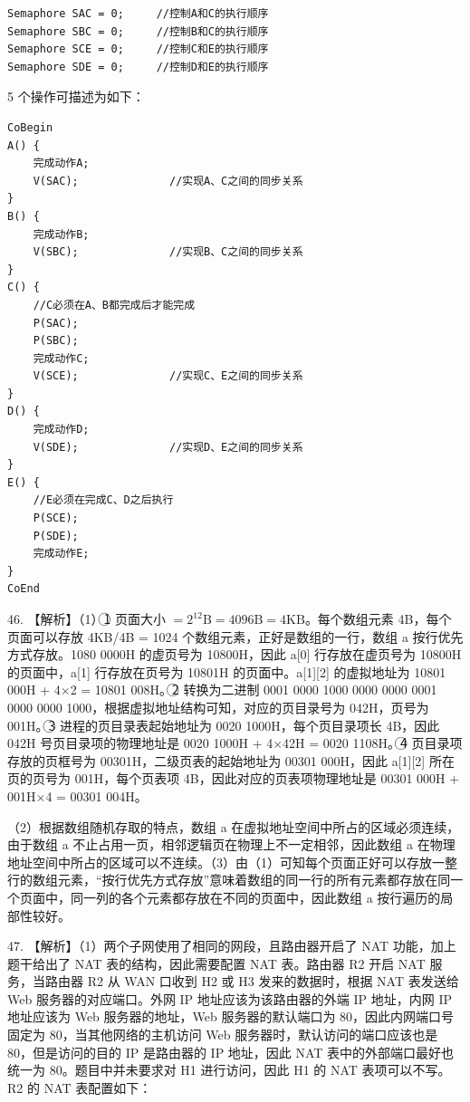\documentclass[UTF8,11pt]{ctexart}
\begin{document}
\begin{Verbatim}[breaklines,breakanywhere,fontsize=\small]
Semaphore SAC = 0;     //控制A和C的执行顺序
Semaphore SBC = 0;     //控制B和C的执行顺序
Semaphore SCE = 0;     //控制C和E的执行顺序
Semaphore SDE = 0;     //控制D和E的执行顺序
\end{Verbatim}

5 个操作可描述为如下：


\begin{Verbatim}[breaklines,breakanywhere,fontsize=\small]
CoBegin
A() {
    完成动作A;
    V(SAC);              //实现A、C之间的同步关系
}
B() {
    完成动作B;
    V(SBC);              //实现B、C之间的同步关系
}
C() {
    //C必须在A、B都完成后才能完成
    P(SAC);
    P(SBC);
    完成动作C;
    V(SCE);              //实现C、E之间的同步关系
}
D() {
    完成动作D;
    V(SDE);              //实现D、E之间的同步关系
}
E() {
    //E必须在完成C、D之后执行
    P(SCE);
    P(SDE);
    完成动作E;
}
CoEnd
\end{Verbatim}

46. 【解析】（1）\textcircled{1} 页面大小 \(\displaystyle =2^{12}\mathrm{B}=4096\mathrm{B}=4\mathrm{KB}\)。每个数组元素 4B，每个页面可以存放 4KB/4B = 1024 个数组元素，正好是数组的一行，数组 a 按行优先方式存放。1080 0000H 的虚页号为 10800H，因此 a[0] 行存放在虚页号为 10800H 的页面中，a[1] 行存放在页号为 10801H 的页面中。a[1][2] 的虚拟地址为 10801 000H + 4\(\displaystyle \times\)2 = 10801 008H。\textcircled{2} 转换为二进制 0001 0000 1000 0000 0000 0001 0000 0000 1000，根据虚拟地址结构可知，对应的页目录号为 042H，页号为 001H。\textcircled{3} 进程的页目录表起始地址为 0020 1000H，每个页目录项长 4B，因此 042H 号页目录项的物理地址是 0020 1000H + 4\(\displaystyle \times\)42H = 0020 1108H。\textcircled{4} 页目录项存放的页框号为 00301H，二级页表的起始地址为 00301 000H，因此 a[1][2] 所在页的页号为 001H，每个页表项 4B，因此对应的页表项物理地址是 00301 000H + 001H\(\displaystyle \times\)4 = 00301 004H。


（2）根据数组随机存取的特点，数组 a 在虚拟地址空间中所占的区域必须连续，由于数组 a 不止占用一页，相邻逻辑页在物理上不一定相邻，因此数组 a 在物理地址空间中所占的区域可以不连续。（3）由（1）可知每个页面正好可以存放一整行的数组元素，“按行优先方式存放”意味着数组的同一行的所有元素都存放在同一个页面中，同一列的各个元素都存放在不同的页面中，因此数组 a 按行遍历的局部性较好。


47. 【解析】（1）两个子网使用了相同的网段，且路由器开启了 NAT 功能，加上题干给出了 NAT 表的结构，因此需要配置 NAT 表。路由器 R2 开启 NAT 服务，当路由器 R2 从 WAN 口收到 H2 或 H3 发来的数据时，根据 NAT 表发送给 Web 服务器的对应端口。外网 IP 地址应该为该路由器的外端 IP 地址，内网 IP 地址应该为 Web 服务器的地址，Web 服务器的默认端口为 80，因此内网端口号固定为 80，当其他网络的主机访问 Web 服务器时，默认访问的端口应该也是 80，但是访问的目的 IP 是路由器的 IP 地址，因此 NAT 表中的外部端口最好也统一为 80。题目中并未要求对 H1 进行访问，因此 H1 的 NAT 表项可以不写。R2 的 NAT 表配置如下：
\end{document}
